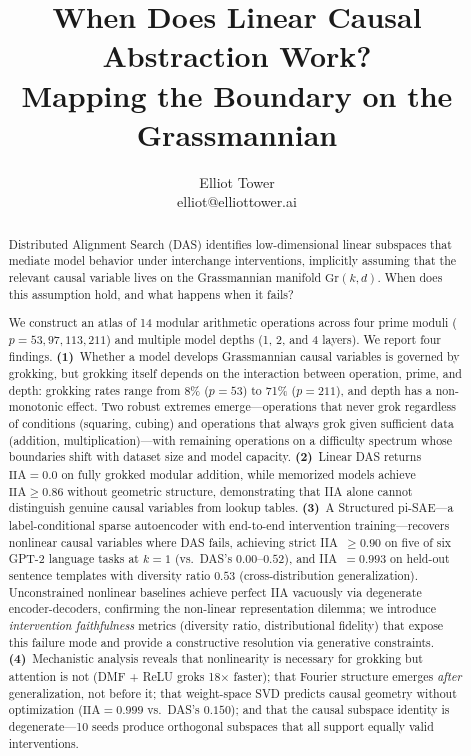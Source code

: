 \documentclass{article}
\title{When Does Linear Causal Abstraction Work?\\
Mapping the Boundary on the Grassmannian}
\author{
\name Elliot Tower \\
\email elliot@elliottower.ai
}
\newcommand{\Gr}{\mathrm{Gr}}
\newcommand{\IIA}{\mathrm{IIA}}
\begin{document}
\maketitle

\begin{abstract}
Distributed Alignment Search (DAS) identifies low-dimensional linear subspaces
that mediate model behavior under interchange interventions, implicitly assuming
that the relevant causal variable lives on the Grassmannian manifold
$\Gr(k,d)$. When does this assumption hold, and what happens when it fails?

We construct an atlas of 14 modular arithmetic operations across four prime
moduli ($p = 53, 97, 113, 211$) and multiple model depths (1, 2, and 4
layers). We report four findings.
\textbf{(1)}~Whether a model develops Grassmannian causal variables is
governed by grokking, but grokking itself depends on the interaction between
operation, prime, and depth: grokking rates range from 8\% ($p{=}53$) to
71\% ($p{=}211$), and depth has a non-monotonic effect. Two robust extremes
emerge---operations that never grok regardless of conditions (squaring,
cubing) and operations that always grok given sufficient data
(addition, multiplication)---with remaining operations on a difficulty
spectrum whose boundaries shift with dataset size and model capacity.
\textbf{(2)}~Linear DAS returns $\IIA = 0.0$ on fully grokked modular
addition, while memorized models achieve $\IIA \geq 0.86$ without geometric
structure, demonstrating that IIA alone cannot distinguish genuine causal
variables from lookup tables.
\textbf{(3)}~A Structured pi-SAE---a label-conditional sparse autoencoder
with end-to-end intervention training---recovers nonlinear causal variables
where DAS fails, achieving strict IIA~$\geq 0.90$ on five of six GPT-2
language tasks at $k{=}1$ (vs.\ DAS's $0.00$--$0.52$), and
IIA~$= 0.993$ on held-out sentence templates with diversity ratio $0.53$
(cross-distribution generalization). Unconstrained
nonlinear baselines achieve perfect IIA vacuously via degenerate
encoder-decoders, confirming the non-linear representation dilemma; we
introduce \emph{intervention faithfulness} metrics (diversity ratio,
distributional fidelity) that expose this failure mode and provide a
constructive resolution via generative constraints.
\textbf{(4)}~Mechanistic analysis reveals that nonlinearity is necessary for
grokking but attention is not (DMF + ReLU groks 18$\times$ faster); that
Fourier structure emerges \emph{after} generalization, not before it; that
weight-space SVD predicts causal geometry without optimization
($\IIA = 0.999$ vs.\ DAS's $0.150$); and that the causal subspace identity
is degenerate---10 seeds produce orthogonal subspaces that all support
equally valid interventions.
\end{abstract}
\end{document}
